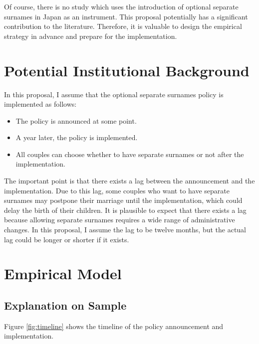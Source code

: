 \documentclass[12pt]{article}
\begin{document}
Of course, there is no study which uses the introduction of optional separate surnames in Japan as an instrument.
This proposal potentially has a significant contribution to the literature.
Therefore, it is valuable to design the empirical strategy in advance and prepare for the implementation.


\section{Potential Institutional Background}
In this proposal, I assume that the optional separate surnames policy is implemented as follows: 
\begin{itemize}
  \item The policy is announced at some point. 
  \item A year later, the policy is implemented.
  \item All couples can choose whether to have separate surnames or not after the implementation.
\end{itemize}
The important point is that there exists a lag between the announcement and the implementation.
Due to this lag, some couples who want to have separate surnames may postpone their marriage until the implementation, which could delay the birth of their children.
It is plausible to expect that there exists a lag because allowing separate surnames requires a wide range of administrative changes.
In this proposal, I assume the lag to be twelve months, but the actual lag could be longer or shorter if it exists.

\section{Empirical Model}
\subsection*{Explanation on Sample}
Figure \ref{fig:timeline} shows the timeline of the policy announcement and implementation.
\end{document}

